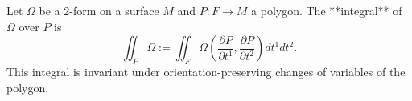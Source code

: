 Let $\Omega$ be a 2-form on a surface $M$ and $P: F \to M$ a polygon. The **integral** of $\Omega$ over $P$ is
$$\iint_P \Omega := \iint_F \Omega\!\left(\frac{\partial P}{\partial t^1}, \frac{\partial P}{\partial t^2}\right) dt^1 dt^2.$$
This integral is invariant under orientation-preserving changes of variables of the polygon.